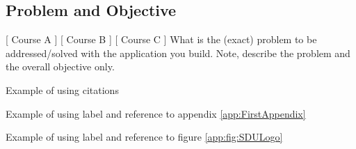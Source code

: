 \subsection{Problem and Objective}
[ Course A ] [ Course B ] [ Course C ] 
\newline
[ Author A] [ Author B ] [ Author C ] 
\newline
What is the (exact) problem to be addressed/solved with the application you build. Note, describe the problem and the overall objective only.



Example of using citations \cite{eu:GDPR}

Example of using label and reference to appendix \ref{app:FirstAppendix}

Example of using label and reference to figure \ref{app:fig:SDULogo}
